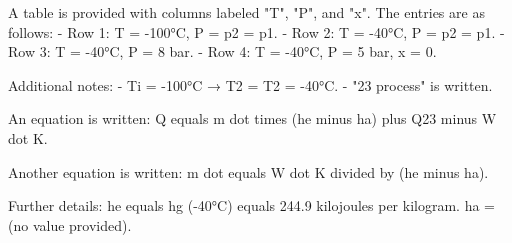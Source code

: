 A table is provided with columns labeled "T", "P", and "x". The entries are as follows:  
- Row 1: T = -100°C, P = p2 = p1.  
- Row 2: T = -40°C, P = p2 = p1.  
- Row 3: T = -40°C, P = 8 bar.  
- Row 4: T = -40°C, P = 5 bar, x = 0.  

Additional notes:  
- Ti = -100°C → T2 = T2 = -40°C.  
- "23 process" is written.  

An equation is written:  
Q equals m dot times (he minus ha) plus Q23 minus W dot K.  

Another equation is written:  
m dot equals W dot K divided by (he minus ha).  

Further details:  
he equals hg (-40°C) equals 244.9 kilojoules per kilogram.  
ha = (no value provided).